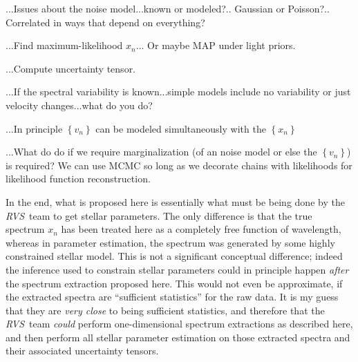\documentclass[11pt]{article}
\newcommand{\setof}[1]{\left\{{#1}\right\}}
\newcommand{\instrument}[1]{\textsl{#1}}
\newcommand{\RVS}{\instrument{RVS}}
\begin{document}
...Issues about the noise model...known or modeled?.. Gaussian or
Poisson?.. Correlated in ways that depend on everything?

...Find maximum-likelihood $x_n$... Or maybe MAP under light priors.

...Compute uncertainty tensor.

...If the spectral variability is known...simple models include no
variability or just velocity changes...what do you do?

...In principle $\setof{v_n}$ can be modeled simultaneously with the
$\setof{x_n}$

...What do do if we require marginalization (of an noise model or else
the $\setof{v_n}$) is required?  We can use MCMC so long as we
decorate chains with likelihoods for likelihood function
reconstruction.

In the end, what is proposed here is essentially what must be being
done by the \RVS\ team to get stellar parameters.
The only difference is that the true spectrum $x_n$ has been treated
here as a completely free function of wavelength, whereas in parameter
estimation, the spectrum was generated by some highly constrained
stellar model.
This is not a significant conceptual difference; indeed the inference
used to constrain stellar parameters could in principle happen
\emph{after} the spectrum extraction proposed here.
This would not even be approximate, if the extracted spectra are
``sufficient statistics'' for the raw data.
It is my guess that they are \emph{very close} to being sufficient
statistics, and therefore that the \RVS\ team \emph{could} perform
one-dimensional spectrum extractions as described here, and then
perform all stellar parameter estimation on those extracted spectra
and their associated uncertainty tensors.
\end{document}
